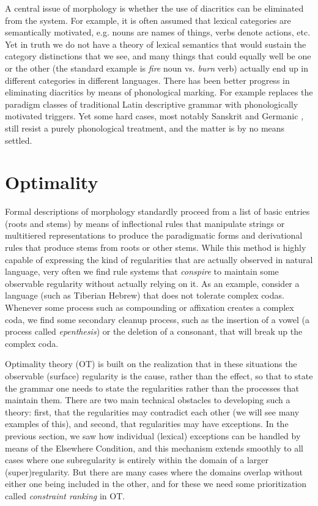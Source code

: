 A central issue of morphology is whether the use of diacritics can be
eliminated from the system. For example, it is often assumed that lexical
categories are semantically motivated, e.g. nouns are names of things, verbs
denote actions, etc.  Yet in truth we do not have a theory of lexical
semantics that would sustain the category distinctions that we see, and many
things that could equally well be one or the other (the standard example is
{\it fire} noun vs. {\it burn} verb) actually end up in different categories
in different languages. There has been better progress in eliminating
diacritics by means of phonological marking. For example 
replaces the paradigm classes of traditional Latin descriptive grammar with
phonologically motivated triggers. Yet some hard cases, most notably Sanskrit
and Germanic \cite{Blevins:2003}, still resist a purely phonological treatment,
and the matter is by no means settled.

\section{Optimality}

Formal descriptions of morphology standardly proceed from a list of basic
entries (roots and stems) by means of inflectional rules that manipulate
strings or multitiered representations to produce the paradigmatic forms and
derivational rules that produce stems from roots or other stems.  While this
method is highly capable of expressing the kind of regularities that are
actually observed in natural language, very often we find rule systems that
{\it conspire} to maintain some observable regularity without actually relying
on it. As an example, consider a language (such as Tiberian Hebrew) that does
not tolerate complex codas. Whenever some process such as compounding or
affixation creates a complex coda, we find some secondary cleanup process,
such as the insertion of a vowel (a process called {\it
  epenthesis\/}) or the deletion of a consonant, that will
break up the complex coda.

Optimality theory (OT) is built on the realization that in these situations
the observable (surface) regularity is the cause, rather than the effect, so
that to state the grammar one needs to state the regularities rather than the
processes that maintain them. There are two main technical obstacles to
developing such a theory: first, that the regularities may contradict each 
other (we will see many examples of this), and second, that regularities may 
have exceptions. In the previous section, we saw how individual (lexical) 
exceptions can be handled by means of the Elsewhere Condition, and this 
mechanism extends smoothly to all cases where one subregularity is entirely 
within the domain of a larger (super)regularity. But there are many cases 
where the domains overlap without either one being included in the other,
and for these we need some prioritization called {\it constraint ranking} 
in OT. 


